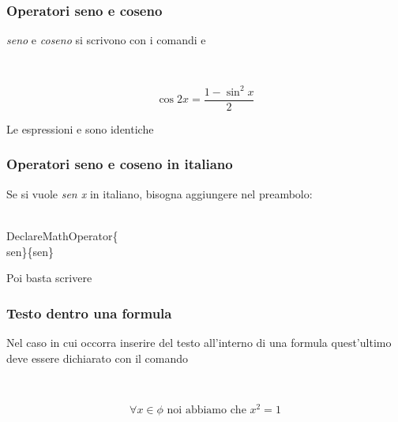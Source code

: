 \documentclass[svgnames,%
	ucs,%
	pdftex]{guitbeamer}
\begin{document}
\begin{frame}
  \frametitle{Operatori seno e coseno}
	\emph{seno} e \emph{coseno} si scrivono con i comandi  e 
	\begin{LaTeXcode}
		\\[\n
		 \hspace*{5ex}\alert{\\cos}2x=\\frac\{1-\alert{\\sin}\textasciicircum2x\}\{2\}\n
		\\]
	\end{LaTeXcode}
	\begin{LaTeXoutput}
		\[
			\cos2x=\frac{1-\sin^2x}{2}
		\]
	\end{LaTeXoutput}
  \bigskip
	\medskip Le espressioni  e   sono identiche
\end{frame}
\begin{frame}
  \frametitle{Operatori seno e coseno in italiano}
	Se si vuole \emph{sen x} in italiano, bisogna aggiungere nel preambolo:
	\begin{LaTeXcode}
		\\DeclareMathOperator\{\\sen\}\{sen\}
	\end{LaTeXcode}
	\medskip Poi basta scrivere 
\end{frame}
\begin{frame}
  \frametitle{Testo dentro una formula}
	Nel caso in cui occorra inserire del testo all'interno di una formula quest'ultimo deve essere dichiarato con il comando 
 	\begin{LaTeXcode}
		\\[\n
		\hspace*{5ex}\\forall x\\in\\phi\alert{\\text\{\ noi abbiamo che \}}x\textasciicircum\{2\}=1\n
		\\]
 	\end{LaTeXcode}
	\begin{LaTeXoutput}
		\[
			\forall x\in\phi\text{ noi abbiamo che } x^{2}=1
		\]
	\end{LaTeXoutput}
\end{frame}
\end{document}
